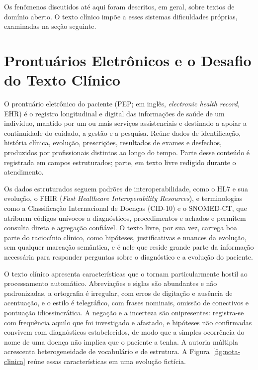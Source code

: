 Os fenômenos discutidos até aqui foram descritos, em geral, sobre textos de domínio aberto. O texto clínico impõe a esses sistemas dificuldades próprias, examinadas na seção seguinte.

\section{Prontuários Eletrônicos e o Desafio do Texto Clínico}\label{sec:prontuarios}

O prontuário eletrônico do paciente (PEP; em inglês, \textit{electronic health record}, EHR) é o registro longitudinal e digital das informações de saúde de um indivíduo, mantido por um ou mais serviços assistenciais e destinado a apoiar a continuidade do cuidado, a gestão e a pesquisa. Reúne dados de identificação, história clínica, evolução, prescrições, resultados de exames e desfechos, produzidos por profissionais distintos ao longo do tempo. Parte desse conteúdo é registrada em campos estruturados; parte, em texto livre redigido durante o atendimento.

Os dados estruturados seguem padrões de interoperabilidade, como o HL7 e sua evolução, o FHIR (\textit{Fast Healthcare Interoperability Resources}), e terminologias como a Classificação Internacional de Doenças (CID-10) e o SNOMED-CT, que atribuem códigos unívocos a diagnósticos, procedimentos e achados e permitem consulta direta e agregação confiável. O texto livre, por sua vez, carrega boa parte do raciocínio clínico, como hipóteses, justificativas e nuances da evolução, sem qualquer marcação semântica, e é nele que reside grande parte da informação necessária para responder perguntas sobre o diagnóstico e a evolução do paciente.

O texto clínico apresenta características que o tornam particularmente hostil ao processamento automático. Abreviações e siglas são abundantes e não padronizadas, a ortografia é irregular, com erros de digitação e ausência de acentuação, e o estilo é telegráfico, com frases nominais, omissão de conectivos e pontuação idiossincrática. A negação e a incerteza são onipresentes: registra-se com frequência aquilo que foi investigado e afastado, e hipóteses não confirmadas convivem com diagnósticos estabelecidos, de modo que a simples ocorrência do nome de uma doença não implica que o paciente a tenha. A autoria múltipla acrescenta heterogeneidade de vocabulário e de estrutura. A Figura~\ref{fig:nota-clinica} reúne essas características em uma evolução fictícia.

